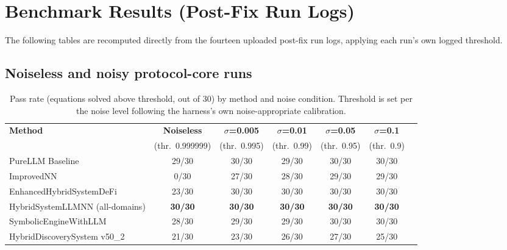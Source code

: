 \documentclass[11pt]{article}
\begin{document}
\section{Benchmark Results (Post-Fix Run Logs)}
\label{sec:results}

The following tables are recomputed directly from the fourteen uploaded
post-fix run logs, applying each run's own logged threshold.

\subsection{Noiseless and noisy protocol-core runs}

\begin{table}[h]
\centering
\caption{Pass rate (equations solved above threshold, out of 30) by
method and noise condition. Threshold is set per the noise level
following the harness's own noise-appropriate calibration.}
\label{tab:core}
\small
\begin{tabular}{@{}lcccccc@{}}
\toprule
\textbf{Method} & \textbf{Noiseless} & \textbf{$\sigma$=0.005} & \textbf{$\sigma$=0.01} & \textbf{$\sigma$=0.05} & \textbf{$\sigma$=0.1} \\
 & (thr.\ 0.999999) & (thr.\ 0.995) & (thr.\ 0.99) & (thr.\ 0.95) & (thr.\ 0.9) \\
\midrule
PureLLM Baseline           & 29/30 & 30/30 & 29/30 & 30/30 & 30/30 \\
ImprovedNN                 &  0/30 & 27/30 & 28/30 & 29/30 & 29/30 \\
EnhancedHybridSystemDeFi   & 23/30 & 30/30 & 30/30 & 30/30 & 30/30 \\
HybridSystemLLMNN (all-domains) & \textbf{30/30} & \textbf{30/30} & \textbf{30/30} & \textbf{30/30} & \textbf{30/30} \\
SymbolicEngineWithLLM      & 28/30 & 29/30 & 29/30 & 30/30 & 30/30 \\
HybridDiscoverySystem v50\_2 & 21/30 & 23/30 & 26/30 & 27/30 & 25/30 \\
\bottomrule
\end{tabular}
\end{table}
\end{document}
